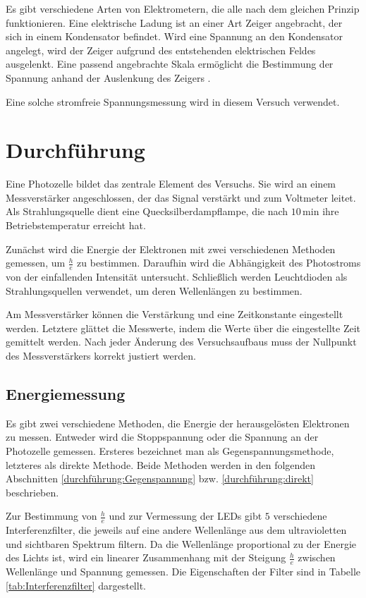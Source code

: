 \documentclass[12pt,a4paper]{scrartcl}
\numberwithin{equation}{section} %
\begin{document}
Es gibt verschiedene Arten von Elektrometern, die alle nach dem gleichen Prinzip funktionieren. Eine elektrische Ladung ist an einer Art Zeiger angebracht, der sich in einem Kondensator befindet. Wird eine Spannung an den Kondensator angelegt, wird der Zeiger aufgrund des entstehenden elektrischen Feldes ausgelenkt. Eine passend angebrachte Skala ermöglicht die Bestimmung der Spannung anhand der Auslenkung des Zeigers \cite{Gerthsen}.

Eine solche stromfreie Spannungsmessung wird in diesem Versuch verwendet.

\clearpage
\hypertarget{durchfuxfchrung}{\section{Durchführung}\label{durchfuxfchrung}}
Eine Photozelle bildet das zentrale Element des Versuchs. Sie wird an einem Messverstärker angeschlossen, der das Signal verstärkt und zum Voltmeter leitet. Als Strahlungsquelle dient eine Quecksilberdampflampe, die nach $10\mathrm{\,min}$ ihre Betriebstemperatur erreicht hat.

Zunächst wird die Energie der Elektronen mit zwei verschiedenen Methoden gemessen, um $\frac{h}{e}$ zu bestimmen. Daraufhin wird die Abhängigkeit des Photostroms von der einfallenden Intensität untersucht. Schließlich werden Leuchtdioden als Strahlungsquellen verwendet, um deren Wellenlängen zu bestimmen.

Am Messverstärker können die Verstärkung und eine Zeitkonstante eingestellt werden. Letztere glättet die Messwerte, indem die Werte über die eingestellte Zeit gemittelt werden. Nach jeder Änderung des Versuchsaufbaus muss der Nullpunkt des Messverstärkers korrekt justiert werden.

\subsection{Energiemessung}
\label{durchführung:Energiemessung}
Es gibt zwei verschiedene Methoden, die Energie der herausgelösten Elektronen zu messen. Entweder wird die Stoppspannung oder die Spannung an der Photozelle gemessen. Ersteres bezeichnet man als Gegenspannungsmethode, letzteres als direkte Methode. Beide Methoden werden in den folgenden Abschnitten \ref{durchführung:Gegenspannung} bzw. \ref{durchführung:direkt} beschrieben.

Zur Bestimmung von $\frac{h}{e}$ und zur Vermessung der LEDs gibt $5$ verschiedene Interferenzfilter, die jeweils auf eine andere Wellenlänge aus dem ultravioletten und sichtbaren Spektrum filtern. Da die Wellenlänge proportional zu der Energie des Lichts ist, wird ein linearer Zusammenhang mit der Steigung $\frac{h}{e}$ zwischen Wellenlänge und Spannung gemessen. Die Eigenschaften der Filter sind in Tabelle \ref{tab:Interferenzfilter} dargestellt.
\end{document}
